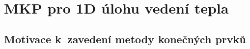 % 
% 
% 






\hypertarget{sec:diff_eq}{%
\section{MKP pro 1D úlohu vedení tepla}
\label{sec:diff_eq}}

\subsection{Motivace k~zavedení metody konečných prvků}


